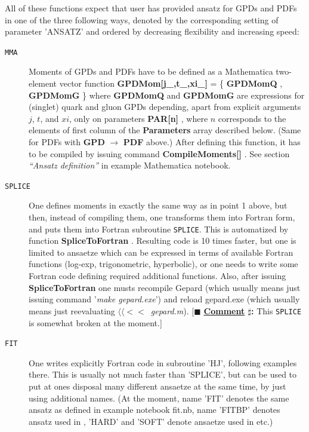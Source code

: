\documentclass[12pt]{article}
\newcounter{comment}
\newcommand{\comminline}[1]{{%
\refstepcounter{comment}%
\ttfamily\small[$\blacksquare$ \textbf{\underline{Comment}
$\sharp$\thecomment:} #1]}}
\newcommand{\mmacomm}[1]{ {\ttfamily \bfseries #1} }
\begin{document}
All of these functions expect that user has provided ansatz for GPDs and PDFs
in one of the three following ways, denoted by the corresponding setting
of parameter 'ANSATZ' and ordered by decreasing flexibility and increasing speed:

\begin{description}
\item[\texttt{MMA}] 
Moments of GPDs and PDFs have to be defined as a Mathematica two-element vector function
\mmacomm{GPDMom[j\_,t\_,xi\_]} = \{\mmacomm{GPDMomQ}, \mmacomm{GPDMomG} \}  where 
\mmacomm{GPDMomQ} and \mmacomm{GPDMomG} are expressions for (singlet) quark and gluon GPDs
depending, apart from explicit arguments $j$, $t$, and $xi$, only on
parameters \mmacomm{PAR[n]}, where $n$ corresponds to the elements of first column of the \mmacomm{Parameters}
array described below. (Same for PDFs with \mmacomm{GPD}$\to$\mmacomm{PDF} above.) 
After defining this function, it has to be compiled by issuing command \mmacomm{CompileMoments[]}.
See section \emph{``Ansatz definition''} in example Mathematica notebook.

\item[\texttt{SPLICE}] 
One defines moments in exactly the same way as in point 1 above, but then, instead of compiling
them, one transforms them into Fortran form, and puts them into Fortran subroutine
\texttt{SPLICE}. This is automatized by function \mmacomm{SpliceToFortran}. Resulting code
is 10 times faster, but one is limited to ansaetze which can be expressed in terms of available
Fortran functions (log-exp, trigonometric, hyperbolic), or one needs to write some
Fortran code defining required additional functions. Also, after issuing \mmacomm{SpliceToFortran}
one musts recompile Gepard (which usually means just issuing command '\emph{make gepard.exe}')
and reload gepard.exe (which usually means just reevaluating $\langle\langle<<$~\emph{gepard.m}).
\comminline{This \texttt{SPLICE} is somewhat broken at the moment.}

\item[\texttt{FIT}] 
One writes explicitly Fortran code in subroutine 'HJ', following examples there. This
is usually not much faster than 'SPLICE', but can be used to put at ones disposal
many different ansaetze at the same time, by just using additional names.
(At the moment, name 'FIT' denotes the same ansatz as defined in example notebook fit.nb,
name 'FITBP' denotes ansatz used in \cite{Kumericki:2007sa}, 'HARD' and 
'SOFT' denote ansaetze used in \cite{Kumericki:2006xx} etc.)
\end{description}
\end{document}
